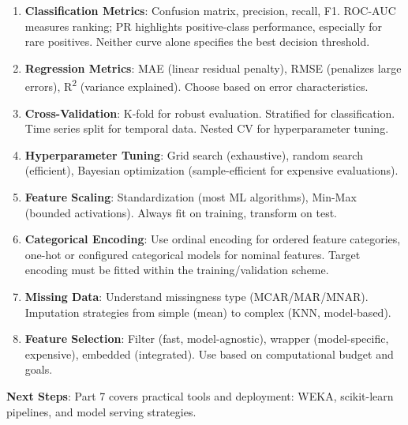 \documentclass[11pt,twoside]{article}
\numberwithin{equation}{section}
\theoremstyle{plain}
\theoremstyle{definition}
\theoremstyle{remark}
\begin{document}
\begin{tcolorbox}[colback=yellow!10!white,colframe=orange!75!black,title=Key Takeaways]
\begin{enumerate}
\item \textbf{Classification Metrics}: Confusion matrix, precision, recall, F1. ROC-AUC measures ranking; PR highlights positive-class performance, especially for rare positives. Neither curve alone specifies the best decision threshold.

\item \textbf{Regression Metrics}: MAE (linear residual penalty), RMSE (penalizes large errors), R\textsuperscript{2} (variance explained). Choose based on error characteristics.

\item \textbf{Cross-Validation}: K-fold for robust evaluation. Stratified for classification. Time series split for temporal data. Nested CV for hyperparameter tuning.

\item \textbf{Hyperparameter Tuning}: Grid search (exhaustive), random search (efficient), Bayesian optimization (sample-efficient for expensive evaluations).

\item \textbf{Feature Scaling}: Standardization (most ML algorithms), Min-Max (bounded activations). Always fit on training, transform on test.

\item \textbf{Categorical Encoding}: Use ordinal encoding for ordered feature categories, one-hot or configured categorical models for nominal features. Target encoding must be fitted within the training/validation scheme.

\item \textbf{Missing Data}: Understand missingness type (MCAR/MAR/MNAR). Imputation strategies from simple (mean) to complex (KNN, model-based).

\item \textbf{Feature Selection}: Filter (fast, model-agnostic), wrapper (model-specific, expensive), embedded (integrated). Use based on computational budget and goals.
\end{enumerate}

\textbf{Next Steps}: Part 7 covers practical tools and deployment: WEKA, scikit-learn pipelines, and model serving strategies.
\end{tcolorbox}
\end{document}
